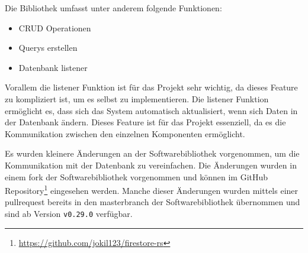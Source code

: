 Die Bibliothek umfasst unter anderem folgende Funktionen:
\begin{itemize}
    \item \ac{CRUD} Operationen
    \item \Glspl{Query} erstellen
    \item Datenbank \Gls{listener}
\end{itemize}

Vorallem die \Gls{listener} Funktion ist für das Projekt sehr wichtig, da dieses Feature zu kompliziert ist, um es selbst zu implementieren. Die \Gls{listener} Funktion ermöglicht es, dass sich das System automatisch aktualisiert, wenn sich Daten in der Datenbank ändern. Dieses Feature ist für das Projekt essenziell, da es die Kommunikation zwischen den einzelnen Komponenten ermöglicht.

Es wurden kleinere Änderungen an der Softwarebibliothek vorgenommen, um die Kommunikation mit der Datenbank zu vereinfachen. Die Änderungen wurden in einem \Gls{fork} der Softwarebibliothek vorgenommen und können im GitHub Repository\footnote{\url{https://github.com/jokil123/firestore-rs}} eingesehen werden. Manche dieser Änderungen wurden mittels einer \Gls{pullrequest} bereits in den \Gls{masterbranch} der Softwarebibliothek übernommen und sind ab Version \texttt{v0.29.0} verfügbar.